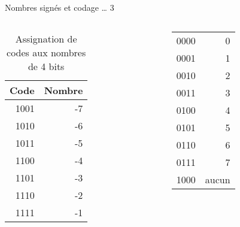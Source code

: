 \documentclass[presentation]{beamer}
\begin{document}
\begin{frame}[label={sec:org46fef6a}]{Nombres signés et codage \ldots{} 3}
\begin{columns}
\begin{column}{0.48\columnwidth}
\begin{block}{}
\begin{table}[htbp]
\caption{\label{tab:org0ac7987}Assignation de codes aux nombres de 4 bits}
\centering
\begin{tabular}{rr}
Code & Nombre\\[0pt]
\hline
1001 & -7\\[0pt]
1010 & -6\\[0pt]
1011 & -5\\[0pt]
1100 & -4\\[0pt]
1101 & -3\\[0pt]
1110 & -2\\[0pt]
1111 & -1\\[0pt]
\end{tabular}
\end{table}
\end{block}
\end{column}

\begin{column}{0.48\columnwidth}
\begin{block}{}
\begin{center}
\begin{tabular}{rr}
0000 & 0\\[0pt]
0001 & 1\\[0pt]
0010 & 2\\[0pt]
0011 & 3\\[0pt]
0100 & 4\\[0pt]
0101 & 5\\[0pt]
0110 & 6\\[0pt]
0111 & 7\\[0pt]
1000 & aucun\\[0pt]
\end{tabular}
\end{center}
\end{block}
\end{column}
\end{columns}
\end{frame}
\end{document}
